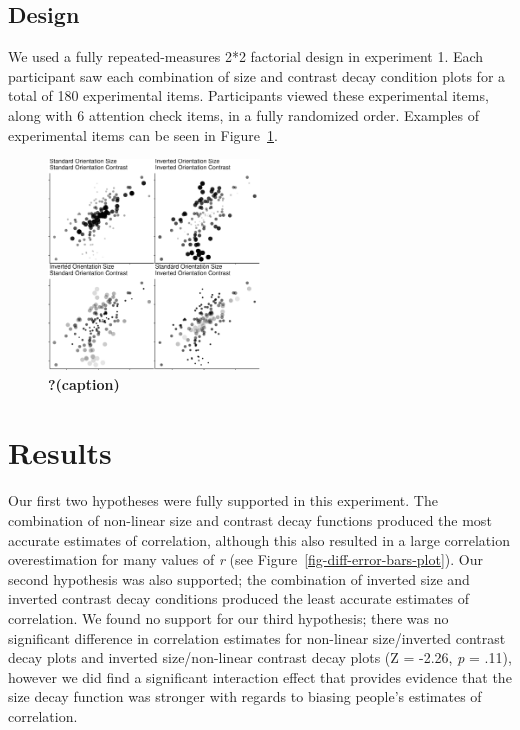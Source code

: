 \documentclass[manuscript, review, anonymous, screen]{acmart}
\begin{document}
\hypertarget{sec-design}{%
\subsection{Design}\label{sec-design}}

We used a fully repeated-measures 2*2 factorial design in experiment 1.
Each participant saw each combination of size and contrast decay
condition plots for a total of 180 experimental items. Participants
viewed these experimental items, along with 6 attention check items, in
a fully randomized order. Examples of experimental items can be seen in
Figure~\ref{fig-examples}.

\begin{figure}

\includegraphics[width=0.5\textwidth,height=\textheight]{size_and_contrast_new_files/figure-pdf/fig-examples-1.pdf} \hfill{}

\caption{\label{fig-examples}\textbf{?(caption)}}

\end{figure}

\hypertarget{sec-results}{%
\section{Results}\label{sec-results}}

Our first two hypotheses were fully supported in this experiment. The
combination of non-linear size and contrast decay functions produced the
most accurate estimates of correlation, although this also resulted in a
large correlation overestimation for many values of \emph{r} (see
Figure~\ref{fig-diff-error-bars-plot}). Our second hypothesis was also
supported; the combination of inverted size and inverted contrast decay
conditions produced the least accurate estimates of correlation. We
found no support for our third hypothesis; there was no significant
difference in correlation estimates for non-linear size/inverted
contrast decay plots and inverted size/non-linear contrast decay plots
(Z = -2.26, \emph{p} = .11), however we did find a significant
interaction effect that provides evidence that the size decay function
was stronger with regards to biasing people's estimates of correlation.
\end{document}
